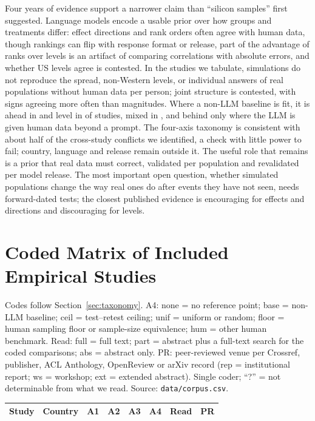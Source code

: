 \documentclass[11pt]{article}
\begin{document}
Four years of evidence support a narrower claim than ``silicon samples'' first suggested. Language models encode a usable prior over how groups and treatments differ: effect directions and rank orders often agree with human data, though rankings can flip with response format or release, part of the advantage of ranks over levels is an artifact of comparing correlations with absolute errors, and whether US levels agree is contested. In the studies we tabulate, simulations do not reproduce the spread, non-Western levels, or individual answers of real populations without human data per person; joint structure is contested, with signs agreeing more often than magnitudes. Where a non-LLM baseline is fit, it is ahead in \cBaseAhead{} and level in \cBaseLevel{} of \cBase{} studies, mixed in \cBaseMixed{}, and behind only where the LLM is given human data beyond a prompt. The four-axis taxonomy is consistent with about half of the cross-study conflicts we identified, a check with little power to fail; country, language and release remain outside it. The useful role that remains is a prior that real data must correct, validated per population and revalidated per model release. The most important open question, whether simulated populations change the way real ones do after events they have not seen, needs forward-dated tests; the closest published evidence \citep{ashokkumar2026,kozlowski2024,pew2026} is encouraging for effects and directions and discouraging for levels.




\appendix
\section{Coded Matrix of Included Empirical Studies}
\label{app:matrix}

Codes follow Section~\ref{sec:taxonomy}. A4: none = no reference point; base = non-LLM baseline; ceil = test--retest ceiling; unif = uniform or random; floor = human sampling floor or sample-size equivalence; hum = other human benchmark. Read: full = full text; part = abstract plus a full-text search for the coded comparisons; abs = abstract only. PR: peer-reviewed venue per Crossref, publisher, ACL Anthology, OpenReview or arXiv record (rep = institutional report; ws = workshop; ext = extended abstract). Single coder; ``?'' = not determinable from what we read. Source: \nolinkurl{data/corpus.csv}.

{\scriptsize
\begin{longtable}{@{}L{3.3cm}L{2.4cm}llllll@{}}
\toprule
Study & Country & A1 & A2 & A3 & A4 & Read & PR \\
\midrule
\endhead

\end{longtable}
}
\end{document}
